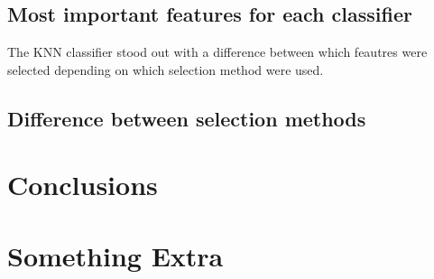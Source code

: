\documentclass{kththesis}
\begin{document}


\section{Most important features for each classifier}


The KNN classifier stood out with a difference between which feautres were selected depending on which selection method were used. %


\section{Difference between selection methods}



\chapter{Conclusions}
\blindtext

\printbibliography[heading=bibintoc]

\appendix

\chapter{Something Extra}

\tailmatter
\end{document}
